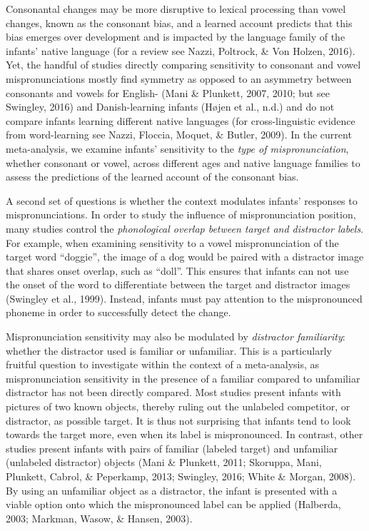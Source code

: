 \documentclass[man, noextraspace]{apa6}
\begin{document}
Consonantal changes may be more disruptive to lexical processing than vowel changes, known as the consonant bias, and a learned account predicts that this bias emerges over development and is impacted by the language family of the infants' native language (for a review see Nazzi, Poltrock, \& Von Holzen, 2016). Yet, the handful of studies directly comparing sensitivity to consonant and vowel mispronunciations mostly find symmetry as opposed to an asymmetry between consonants and vowels for English- (Mani \& Plunkett, 2007, 2010; but see Swingley, 2016) and Danish-learning infants (Højen et al., n.d.) and do not compare infants learning different native languages (for cross-linguistic evidence from word-learning see Nazzi, Floccia, Moquet, \& Butler, 2009). In the current meta-analysis, we examine infants' sensitivity to the \emph{type of mispronunciation}, whether consonant or vowel, across different ages and native language families to assess the predictions of the learned account of the consonant bias.

A second set of questions is whether the context modulates infants' responses to mispronunciations. In order to study the influence of mispronunciation position, many studies control the \emph{phonological overlap between target and distractor labels}. For example, when examining sensitivity to a vowel mispronunciation of the target word \enquote{doggie}, the image of a dog would be paired with a distractor image that shares onset overlap, such as \enquote{doll}. This ensures that infants can not use the onset of the word to differentiate between the target and distractor images (Swingley et al., 1999). Instead, infants must pay attention to the mispronounced phoneme in order to successfully detect the change.

Mispronunciation sensitivity may also be modulated by \emph{distractor familiarity}: whether the distractor used is familiar or unfamiliar. This is a particularly fruitful question to investigate within the context of a meta-analysis, as mispronunciation sensitivity in the presence of a familiar compared to unfamiliar distractor has not been directly compared. Most studies present infants with pictures of two known objects, thereby ruling out the unlabeled competitor, or distractor, as possible target. It is thus not surprising that infants tend to look towards the target more, even when its label is mispronounced. In contrast, other studies present infants with pairs of familiar (labeled target) and unfamiliar (unlabeled distractor) objects (Mani \& Plunkett, 2011; Skoruppa, Mani, Plunkett, Cabrol, \& Peperkamp, 2013; Swingley, 2016; White \& Morgan, 2008). By using an unfamiliar object as a distractor, the infant is presented with a viable option onto which the mispronounced label can be applied (Halberda, 2003; Markman, Wasow, \& Hansen, 2003).
\end{document}
